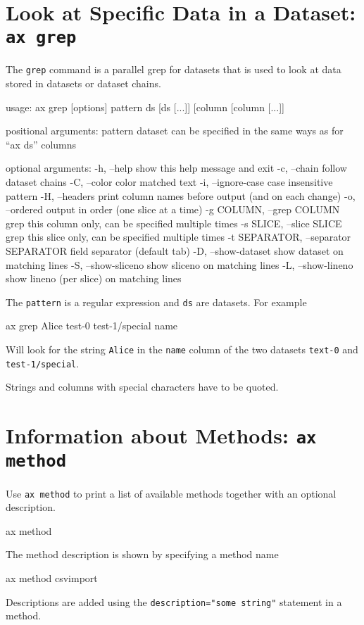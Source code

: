 \section{Look at Specific Data in a Dataset: \texttt{ax grep}}
The \texttt{grep} command is a parallel grep for datasets that is
used to look at data stored in datasets or dataset chains.
\begin{shell}
  usage: ax grep [options] pattern ds [ds [...]] [column [column [...]]

    positional arguments:
    pattern
    dataset               can be specified in the same ways as for ``ax ds''
    columns

    optional arguments:
    -h, --help            show this help message and exit
    -c, --chain           follow dataset chains
    -C, --color           color matched text
    -i, --ignore-case     case insensitive pattern
    -H, --headers         print column names before output (and on each change)
    -o, --ordered         output in order (one slice at a time)
    -g COLUMN, --grep COLUMN
    grep this column only, can be specified multiple times
    -s SLICE, --slice SLICE
    grep this slice only, can be specified multiple times
    -t SEPARATOR, --separator SEPARATOR
    field separator (default tab)
    -D, --show-dataset    show dataset on matching lines
    -S, --show-sliceno    show sliceno on matching lines
    -L, --show-lineno     show lineno (per slice) on matching lines
\end{shell}
\noindent The \texttt{pattern} is a regular expression and \texttt{ds} are
datasets.  For example
\begin{shell}
ax grep Alice test-0 test-1/special name
\end{shell}
Will look for the string \texttt{Alice} in the \texttt{name} column of
the two datasets \texttt{text-0} and \texttt{test-1/special}.

Strings and columns with special characters have to be quoted.


\section{Information about Methods: \texttt{ax method}}
Use \texttt{ax method} to print a list of available methods together
with an optional description.
\begin{shell}
ax method
\end{shell}
The method description is shown by specifying a method name
\begin{shell}
ax method csvimport
\end{shell}
Descriptions are added using the \texttt{description="some string"}
statement in a method.



